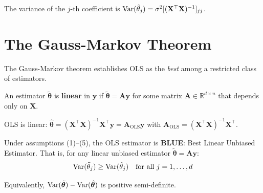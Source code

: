 \documentclass[main.tex]{subfiles}
\begin{document}
The variance of the $j$-th coefficient is $\text{Var}(\hat{\theta}_j) = \sigma^2 [(\mathbf{X}^\top\mathbf{X})^{-1}]_{jj}$.

\needspace{0.33\textheight}
\section{The Gauss-Markov Theorem}

The Gauss-Markov theorem establishes OLS as the \textit{best} among a restricted class of estimators.

\begin{definition}
An estimator $\tilde{\boldsymbol{\theta}}$ is \textbf{linear} in $\mathbf{y}$ if $\tilde{\boldsymbol{\theta}} = \mathbf{A}\mathbf{y}$ for some matrix $\mathbf{A} \in \mathbb{R}^{d \times n}$ that depends only on $\mathbf{X}$.
\end{definition}

OLS is linear: $\hat{\boldsymbol{\theta}} = (\mathbf{X}^\top\mathbf{X})^{-1}\mathbf{X}^\top\mathbf{y} = \mathbf{A}_{\text{OLS}}\mathbf{y}$ with $\mathbf{A}_{\text{OLS}} = (\mathbf{X}^\top\mathbf{X})^{-1}\mathbf{X}^\top$.

\begin{theorem}
Under assumptions (1)--(5), the OLS estimator is \textbf{BLUE}: Best Linear Unbiased Estimator. That is, for any linear unbiased estimator $\tilde{\boldsymbol{\theta}} = \mathbf{A}\mathbf{y}$:
$$\text{Var}(\tilde{\theta}_j) \geq \text{Var}(\hat{\theta}_j) \quad \text{for all } j = 1, \ldots, d$$

Equivalently, $\text{Var}(\tilde{\boldsymbol{\theta}}) - \text{Var}(\hat{\boldsymbol{\theta}})$ is positive semi-definite.
\end{theorem}
\end{document}
